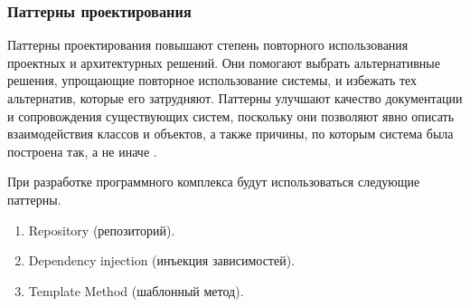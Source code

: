\subsubsection{Паттерны проектирования}

Паттерны проектирования повышают степень повторного использования проектных и архитектурных решений. Они помогают выбрать альтернативные решения, упрощающие повторное использование системы, и избежать тех альтернатив, которые его затрудняют. Паттерны улучшают качество документации и сопровождения существующих систем, поскольку они позволяют явно описать взаимодействия классов и объектов, а также причины, по которым система была построена так, а не иначе \cite{patterns}.

При разработке программного комплекса будут использоваться следующие паттерны.

\begin{enumerate}[label*=\arabic*.]
	\item Repository (репозиторий). \cite{repository_pattern}
	\item Dependency injection (инъекция зависимостей). \cite{dependency_injection}
	\item Template Method (шаблонный метод). \cite{patterns}
	
\end{enumerate}


